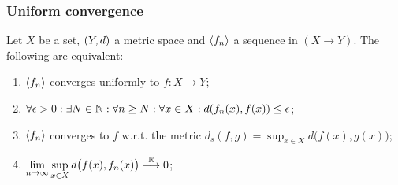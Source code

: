 \subsubsection{Uniform convergence}
\begin{proposition} \label{metricUniformConvergence}
Let $X$ be a set, $\sSet{Y,d}$ a metric space and $\left\langle f_n \right\rangle$ a sequence in $(X\to Y)$. The following are equivalent:
\begin{enumerate}
\item  $\left\langle f_n \right\rangle$ converges uniformly to $f: X\to Y$;
\item $\forall \epsilon > 0: \exists N\in \mathbb{N}: \forall n \geq N: \forall x\in X:  d(f_n(x), f(x)) \leq \epsilon$;
\item $\left\langle f_n \right\rangle$ converges to $f$ w.r.t. the metric $d_s(f,g) = \sup_{x\in X}d\big(f(x), g(x)\big)$;
\item $\displaystyle\lim_{n\to \infty} \sup_{x\in X}d\big(f(x), f_n(x)\big)\overset{\mathbb{R}}{\longrightarrow} 0$;
\end{enumerate}
\end{proposition}
